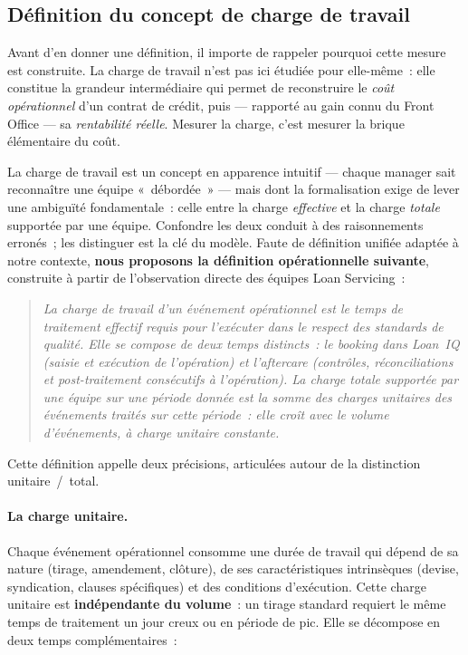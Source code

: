 \subsection{Définition du concept de charge de travail}
\label{subsec:definition-charge}

Avant d'en donner une définition, il importe de rappeler pourquoi cette mesure est construite. La charge de travail n'est pas ici étudiée pour elle-même~: elle constitue la grandeur intermédiaire qui permet de reconstruire le \textit{coût opérationnel} d'un contrat de crédit, puis --- rapporté au gain connu du Front Office --- sa \textit{rentabilité réelle}. Mesurer la charge, c'est mesurer la brique élémentaire du coût.

La charge de travail est un concept en apparence intuitif --- chaque manager sait reconnaître une équipe «~débordée~» --- mais dont la formalisation exige de lever une ambiguïté fondamentale~: celle entre la charge \textit{effective} et la charge \textit{totale} supportée par une équipe. Confondre les deux conduit à des raisonnements erronés~; les distinguer est la clé du modèle.
Faute de définition unifiée adaptée à notre contexte, \textbf{nous proposons la
définition opérationnelle suivante}, construite à partir de l'observation directe
des équipes Loan Servicing~:

\begin{quote}
\textit{La charge de travail d'un événement opérationnel est le temps de traitement effectif requis pour l'exécuter dans le respect des standards de qualité. Elle se compose de deux temps distincts~: le \textup{booking} dans Loan~IQ (saisie et exécution de l'opération) et l'\textup{aftercare} (contrôles, réconciliations et post-traitement consécutifs à l'opération). La charge totale supportée par une équipe sur une période donnée est la somme des charges unitaires des événements traités sur cette période~: elle croît avec le volume d'événements, à charge unitaire constante.}
\end{quote}

Cette définition appelle deux précisions, articulées autour de la distinction unitaire~/~total.

\paragraph{La charge unitaire.}
Chaque événement opérationnel consomme une durée de travail qui dépend de sa nature (tirage, amendement, clôture), de ses caractéristiques intrinsèques (devise, syndication, clauses spécifiques) et des conditions d'exécution. Cette charge unitaire est \textbf{indépendante du volume}~: un tirage standard requiert le même temps de traitement un jour creux ou en période de pic. Elle se décompose en deux temps complémentaires~:

